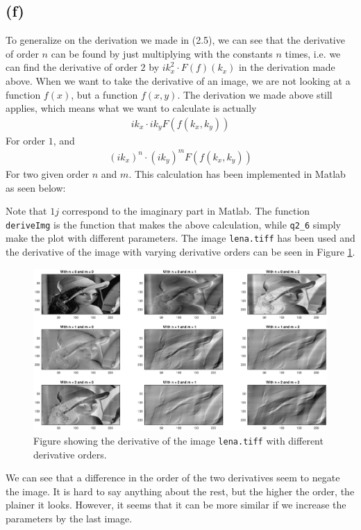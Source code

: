 \documentclass[a4paper]{article}
\begin{document}
\subsection{(f)}
To generalize on the derivation we made in (2.5), we can see that the derivative of order $n$ can be found by just multiplying with the constants $n$ times, i.e. we can find the derivative of order $2$ by $ik_x^2\cdot F(f)(k_x)$ in the derivation made above. When we want to take the derivative of an image, we are not looking at a function $f(x)$, but a function $f(x,y)$. The derivation we made above still applies, which means what we want to calculate is actually
\begin{align*}
  ik_x\cdot ik_y F(f(k_x, k_y))
\end{align*}
For order $1$, and
\begin{align*}
  (ik_x)^n\cdot (ik_y)^m F(f(k_x, k_y))
\end{align*}
For two given order $n$ and $m$. This calculation has been implemented in Matlab as seen below:

Note that $1j$ correspond to the imaginary part in Matlab. The function \texttt{deriveImg} is the function that makes the above calculation, while \texttt{q2\_6} simply make the plot with different parameters. The image \texttt{lena.tiff} has been used and the derivative of the image with varying derivative orders can be seen in Figure \ref{fig2_6}.
\begin{figure}[H]
  \centering
  \captionsetup{justification=centering}
  \includegraphics[width=\textwidth]{fig2_6.eps}
  \caption{Figure showing the derivative of the image \texttt{lena.tiff} with different derivative orders.}
  \label{fig2_6}
\end{figure}
We can see that a difference in the order of the two derivatives seem to negate the image. It is hard to say anything about the rest, but the higher the order, the plainer it looks. However, it seems that it can be more similar if we increase the parameters by the last image.
\end{document}
